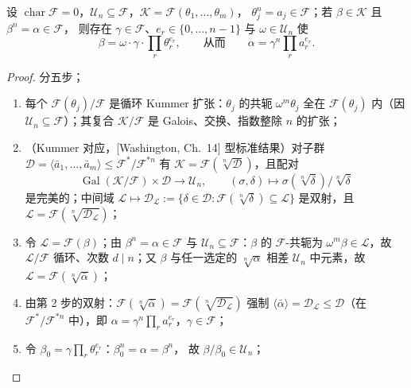 \documentclass[UTF8,a4paper,11pt]{ctexart}
\begin{document}
\begin{theorem}
\label{thm:landau}
设 $\operatorname{char}\mathscr{F}=0$，$\mathscr{U}_n\subseteq \mathscr{F}$，$\mathscr{K}=\mathscr{F}(\theta_1,\dots,\theta_m)$，
$\theta_j^n=a_j\in \mathscr{F}$；若 $\beta\in\mathscr{K}$ 且 $\beta^n=\alpha\in \mathscr{F}$，
则存在 $\gamma\in \mathscr{F}$、$e_r\in\{0,\dots,n-1\}$ 与 $\omega\in\mathscr{U}_n$ 使
\[
\beta=\omega\cdot\gamma\cdot\prod_r\theta_r^{e_r},
\qquad\text{从而}\qquad
\alpha=\gamma^n\prod_r a_r^{e_r}.
\]
\end{theorem}

\begin{proof}
分五步；
\begin{enumerate}
\item 每个 $\mathscr{F}(\theta_j)/\mathscr{F}$ 是循环 Kummer 扩张：$\theta_j$ 的共轭 $\omega^m\theta_j$
全在 $\mathscr{F}(\theta_j)$ 内（因 $\mathscr{U}_n\subseteq \mathscr{F}$）；其复合 $\mathscr{K}/\mathscr{F}$ 是
Galois、交换、指数整除 $n$ 的扩张；
\item （Kummer 对应，[Washington, Ch.~14] 型标准结果）对子群
$\mathscr{D}=\langle\bar a_1,\dots,\bar a_m\rangle\le \mathscr{F}^*/\mathscr{F}^{*n}$ 有
$\mathscr{K}=\mathscr{F}(\sqrt[n]{\mathscr{D}})$，且配对
\[
\operatorname{Gal}(\mathscr{K}/\mathscr{F})\times\mathscr{D}\to\mathscr{U}_n,\qquad
(\sigma,\delta)\mapsto\sigma(\sqrt[n]\delta)/\sqrt[n]\delta
\]
是完美的；中间域 $\mathscr{L}\mapsto\mathscr{D}_\mathscr{L}:=\{\delta\in\mathscr{D}:\mathscr{F}(\sqrt[n]\delta)\subseteq \mathscr{L}\}$
是双射，且 $\mathscr{L}=\mathscr{F}(\sqrt[n]{\mathscr{D}_\mathscr{L}})$；
\item 令 $\mathscr{L}=\mathscr{F}(\beta)$；由 $\beta^n=\alpha\in \mathscr{F}$ 与 $\mathscr{U}_n\subseteq \mathscr{F}$：$\beta$ 的
$\mathscr{F}$-共轭为 $\omega^m\beta\in \mathscr{L}$，故 $\mathscr{L}/\mathscr{F}$ 循环、次数 $d\mid n$；又 $\beta$ 与任一选定的
$\sqrt[n]\alpha$ 相差 $\mathscr{U}_n$ 中元素，故 $\mathscr{L}=\mathscr{F}(\sqrt[n]{\bar\alpha})$；
\item 由第 2 步的双射：$\mathscr{F}(\sqrt[n]{\bar\alpha})=\mathscr{F}(\sqrt[n]{\mathscr{D}_\mathscr{L}})$ 强制
$\langle\bar\alpha\rangle=\mathscr{D}_\mathscr{L}\le\mathscr{D}$（在 $\mathscr{F}^*/\mathscr{F}^{*n}$ 中），即
$\alpha=\gamma^n\prod_r a_r^{e_r}$，$\gamma\in \mathscr{F}$；
\item 令 $\beta_0=\gamma\prod_r\theta_r^{e_r}$：$\beta_0^n=\alpha=\beta^n$，
故 $\beta/\beta_0\in\mathscr{U}_n$；
\end{enumerate}
\end{proof}
\end{document}

